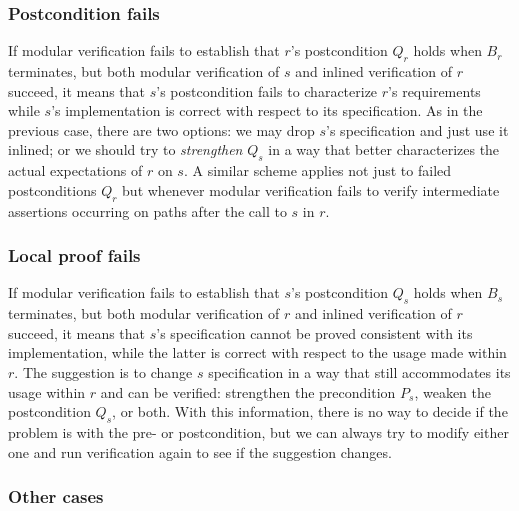 \subsubsection{Postcondition fails}

If modular verification fails to establish that $r$'s postcondition $Q_r$ holds when $B_r$ terminates, but both modular verification of $s$ and inlined verification of $r$ succeed, it means that $s$'s postcondition fails to characterize $r$'s requirements while $s$'s  implementation is correct with respect to its specification.
As in the previous case, there are two options: we may drop $s$'s specification and just use it inlined; or we should try to \emph{strengthen} $Q_s$ in a way that better characterizes the actual expectations of $r$ on $s$.
A similar scheme applies not just to failed postconditions $Q_r$  but whenever modular verification fails to verify intermediate assertions occurring on paths after the call to $s$ in $r$.


\subsubsection{Local proof fails}

If modular verification fails to establish that $s$'s postcondition $Q_s$ holds when $B_s$ terminates, but both modular verification of $r$ and inlined verification of $r$ succeed, it means that $s$'s specification cannot be proved consistent with its implementation, while the latter  is correct with respect to the usage made within $r$.
The suggestion is to change $s$ specification in a way that still accommodates its usage within $r$ and can be verified: strengthen the precondition $P_s$, weaken the postcondition $Q_s$, or both.
With this information, there is no way to decide if the problem is with the pre- or postcondition, but we can always try to modify either one and run verification again to see if the suggestion changes.


\subsubsection{Other cases}

